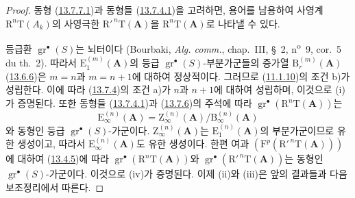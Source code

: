 \begin{proof}
동형 (\hyperref[0.13.7.7.1-fr]{13.7.7.1})과 동형들
(\hyperref[0.13.7.4.1-fr]{13.7.4.1})을 고려하면, 용어를 남용하여
사영계 $\mathrm R^n\mathrm T(A_k)$의 사영극한
$\mathrm R'^{\,n}\mathrm T(\mathbf A)$을
$\mathrm R^n\mathrm T(\mathbf A)$로 나타낼 수 있다.

등급환 $\operatorname{gr}^\bullet(S)$는 뇌터이다
(Bourbaki, \emph{Alg. comm.}, chap.~III, \S~2,
n\textsuperscript{o}~9, cor.~5 du th.~2). 따라서
$\mathrm E_1^{(m)}(\mathbf A)$의 등급
$\operatorname{gr}^\bullet(S)$-부분가군들의 증가열
$\mathrm B_r^{(m)}(\mathbf A)$
(\hyperref[0.13.6.6-fr]{13.6.6})은 $m=n$과 $m=n+1$에 대하여
정상적이다. 그러므로 (\hyperref[0.11.1.10-fr]{11.1.10})의 조건 b)가
성립한다. 이에 따라 (\hyperref[0.13.7.4-fr]{13.7.4})의 조건 a)가
$n$과 $n+1$에 대하여 성립하며, 이것으로 (i)가 증명된다. 또한 동형들
(\hyperref[0.13.7.4.1-fr]{13.7.4.1})과
(\hyperref[0.13.7.6-fr]{13.7.6})의 주석에 따라
$\operatorname{gr}^\bullet(\mathrm R^n\mathrm T(\mathbf A))$는
\[
\mathrm E_\infty^{(n)}(\mathbf A)=
\mathrm Z_\infty^{(n)}(\mathbf A)/\mathrm B_\infty^{(n)}(\mathbf A)
\]
와 동형인 등급 $\operatorname{gr}^\bullet(S)$-가군이다.
$\mathrm Z_\infty^{(n)}(\mathbf A)$는
$\mathrm E_1^{(n)}(\mathbf A)$의 부분가군이므로 유한 생성이고, 따라서
$\mathrm E_\infty^{(n)}(\mathbf A)$도 유한 생성이다. 한편 여과
$(\mathrm F^p(\mathrm R'^{\,n}\mathrm T(\mathbf A)))$에 대하여
(\hyperref[0.13.4.5-fr]{13.4.5})에 따라
$\operatorname{gr}^\bullet(\mathrm R^n\mathrm T(\mathbf A))$와
$\operatorname{gr}^\bullet(\mathrm R'^{\,n}\mathrm T(\mathbf A))$는
동형인 $\operatorname{gr}^\bullet(S)$-가군이다. 이것으로 (iv)가
증명된다. 이제 (ii)와 (iii)은 앞의 결과들과 다음 보조정리에서 따른다.
\end{proof}

